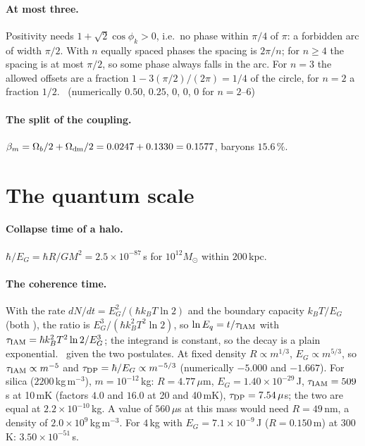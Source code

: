 \paragraph{At most three.} Positivity needs $1+\sqrt2\cos\phi_k>0$, i.e.\ no phase within $\pi/4$ of $\pi$: a forbidden arc of width $\pi/2$. With
$n$ equally spaced phases the spacing is $2\pi/n$; for $n\ge4$ the spacing is at most $\pi/2$, so some phase always falls in the arc. For $n=3$ the
allowed offsets are a fraction $1-3(\pi/2)/(2\pi)=1/4$ of the circle, for $n=2$ a fraction $1/2$. \derived\ (numerically $0.50$, $0.25$, $0$, $0$, $0$ for
$n=2$--$6$)

\paragraph{The split of the coupling.} $\beta_m=\Omega_b/2+\Omega_{\rm dm}/2=0.0247+0.1330=0.1577$, baryons $15.6\,\%$. \calc

\section{The quantum scale}\label{app:der:quantum}
\paragraph{Collapse time of a halo.} $\hbar/E_G=\hbar R/GM^2=2.5\times10^{-87}$\,s for $10^{12}M_\odot$ within $200$\,kpc. \calc

\paragraph{The coherence time.} With the rate $dN/dt=E_G^2/(\hbar k_BT\ln2)$ and the boundary capacity $k_BT/E_G$ (both \conjecture), the ratio is
$E_G^3/(\hbar k_B^2T^2\ln2)$, so $\ln E_q=t/\tau_{\rm IAM}$ with $\tau_{\rm IAM}=\hbar k_B^2T^2\ln2/E_G^3$; the integrand is constant, so the decay is a
plain exponential. \derived\ given the two postulates. At fixed density $R\propto m^{1/3}$, $E_G\propto m^{5/3}$, so $\tau_{\rm IAM}\propto m^{-5}$ and
$\tau_{\rm DP}=\hbar/E_G\propto m^{-5/3}$ (numerically $-5.000$ and $-1.667$). For silica ($2200$\,kg\,m$^{-3}$), $m=10^{-12}$\,kg: $R=4.77\,\mu$m,
$E_G=1.40\times10^{-29}$\,J, $\tau_{\rm IAM}=509$\,s at 10\,mK (factors $4.0$ and $16.0$ at 20 and 40\,mK), $\tau_{\rm DP}=7.54\,\mu$s; the two are equal at
$2.2\times10^{-10}$\,kg. A value of $560\,\mu$s at this mass would need $R=49$\,nm, a density of $2.0\times10^9$\,kg\,m$^{-3}$. For $4$\,kg with
$E_G=7.1\times10^{-9}$\,J ($R=0.150$\,m) at 300\,K: $3.50\times10^{-51}$\,s. \calc

